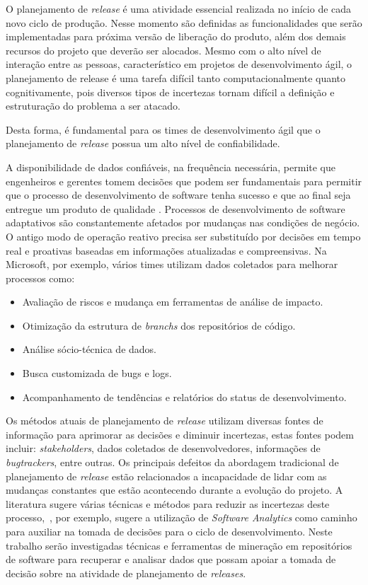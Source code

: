 O planejamento de \textit{release} é uma atividade essencial realizada no início de cada novo ciclo de produção. Nesse momento são definidas as funcionalidades que serão implementadas para próxima versão de liberação do produto, além dos demais recursos do projeto que deverão ser alocados. Mesmo com o alto nível de interação entre as pessoas, característico em projetos de desenvolvimento ágil, o planejamento de release é uma tarefa difícil tanto computacionalmente quanto cognitivamente, pois diversos tipos de incertezas tornam difícil a definição e estruturação do problema a ser atacado\cite{Ngo}.

Desta forma, é fundamental para os times de desenvolvimento ágil que o planejamento de \textit{release} possua um alto nível de confiabilidade\cite{McDaid}.

A disponibilidade de dados confiáveis, na frequência necessária, permite que engenheiros e gerentes tomem decisões que podem ser fundamentais para permitir que o processo de desenvolvimento de software tenha sucesso e que ao final seja entregue um produto de qualidade \cite{codemine}. Processos de desenvolvimento de software adaptativos são constantemente afetados por mudanças nas condições de negócio. O antigo modo de operação reativo precisa ser substituído por decisões em tempo real e proativas baseadas em informações atualizadas e compreensivas\cite{artAndScience}. Na Microsoft, por exemplo, vários times utilizam dados coletados para melhorar processos como:

\begin{itemize}
    \item Avaliação de riscos e mudança em ferramentas de análise de impacto.
    \item Otimização da estrutura de \textit{branchs} dos repositórios de código.
    \item Análise sócio-técnica de dados.
    \item Busca customizada de bugs e logs.
    \item Acompanhamento de tendências e relatórios do status de desenvolvimento.
\end{itemize}

    Os métodos atuais de planejamento de \textit{release} utilizam diversas fontes de informação para aprimorar as decisões e diminuir incertezas, estas fontes podem incluir: \textit{stakeholders}, dados coletados de desenvolvedores, informações de \textit{bugtrackers}, entre outras. Os principais defeitos da abordagem tradicional de planejamento de \textit{release} estão relacionados a incapacidade de lidar com as mudanças constantes que estão acontecendo durante a evolução do projeto. A literatura sugere várias técnicas e métodos para reduzir as incertezas deste processo,~\cite{artAndScience}, por exemplo, sugere a utilização de \textit{Software Analytics} como caminho para auxiliar na tomada de decisões para o ciclo de desenvolvimento.
Neste trabalho serão investigadas técnicas e ferramentas de mineração em repositórios de software para recuperar e analisar dados que possam apoiar a tomada de decisão sobre na atividade de planejamento de \textit{releases}.

